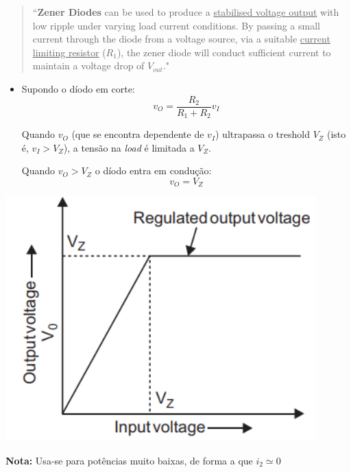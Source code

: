 \begin{quote}
    ``\textbf{Zener Diodes} can be used to produce a \underline{stabilised voltage output} with low ripple under varying load current conditions. By passing a small current through the diode from a voltage source, via a suitable \underline{current limiting resistor} ($R_1$), the zener diode will conduct sufficient current to maintain a voltage drop of $V_\textit{out}$."
\end{quote}

\vspace{0.7 em}
\begin{center}
    \begin{minipage}{0.6\textwidth}
        \begin{itemize}[leftmargin=*]
        \item[] Supondo o díodo em corte:
        $$
            \boxed{v_O = \dfrac{R_2}{R_1 + R_2}v_I}
        $$

        Quando $v_O$ (que se encontra dependente de $v_I$) ultrapassa o treshold $V_Z$ (isto é, $v_I > V_Z$), a tensão na \textit{load} é limitada a $V_Z$. 
        
        Quando $v_O > V_Z$ o díodo entra em condução:
        $$
            \boxed{v_O = V_Z}
        $$
        \end{itemize}
    \end{minipage}%
    \hfill
    \begin{minipage}{0.4\textwidth}
        \begin{center}
            \includegraphics[width=0.9\textwidth]{img/2/chara-ten-reg.png}
            \label{img:chara-ten-reg}
        \end{center}
    \end{minipage}
\end{center}
\noindent \textbf{Nota:} Usa-se para potências muito baixas, de forma a que $i_2 \simeq 0$
